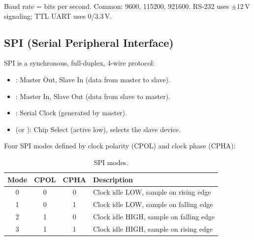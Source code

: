 Baud rate = bits per second. Common: 9600, 115200, 921600. RS-232 uses $\pm$12\,V signaling; TTL UART uses 0/3.3\,V.

\subsection{SPI (Serial Peripheral Interface)}

SPI is a synchronous, full-duplex, 4-wire protocol:
\begin{itemize}[nosep]
  \item {}: Master Out, Slave In (data from master to slave).
  \item {}: Master In, Slave Out (data from slave to master).
  \item {}: Serial Clock (generated by master).
  \item {} (or ): Chip Select (active low), selects the slave device.
\end{itemize}

Four SPI modes defined by clock polarity (CPOL) and clock phase (CPHA):

\begin{table}[H]
\centering
\caption{SPI modes.}
\begin{tabular}{c c c l}
\toprule
\textbf{Mode} & \textbf{CPOL} & \textbf{CPHA} & \textbf{Description} \\
\midrule
0 & 0 & 0 & Clock idle LOW, sample on rising edge \\
1 & 0 & 1 & Clock idle LOW, sample on falling edge \\
2 & 1 & 0 & Clock idle HIGH, sample on falling edge \\
3 & 1 & 1 & Clock idle HIGH, sample on rising edge \\
\bottomrule
\end{tabular}
\end{table}

